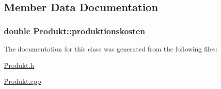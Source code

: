 \subsection{Member Data Documentation}
\hypertarget{classProdukt_ad7901109c0a1ec4ac65fd898d6d8405b}{}
\subsubsection[{produktionskosten}]{\setlength{\rightskip}{0pt plus 5cm}double Produkt\+::produktionskosten\hspace{0.3cm}{\ttfamily [private]}}\label{classProdukt_ad7901109c0a1ec4ac65fd898d6d8405b}


The documentation for this class was generated from the following files\+:\begin{DoxyCompactItemize}
\item 
\hyperlink{Produkt_8h}{Produkt.\+h}\item 
\hyperlink{Produkt_8cpp}{Produkt.\+cpp}\end{DoxyCompactItemize}
